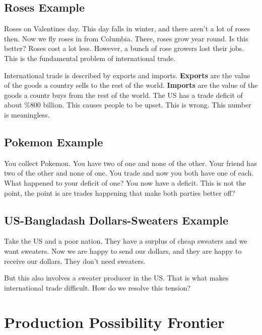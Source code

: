 \documentclass{article}
\begin{document}
\subsection{Roses Example}

Roses on Valentines day. This day falls in winter, and there aren't a lot of
roses then. Now we fly roses in from Columbia. There, roses grow year round. Is
this better? Roses cost a lot less. However, a bunch of rose growers lost their
jobs. This is the fundamental problem of international trade. 

\bigbreak

International trade is described by exports and imports. \textbf{Exports} are
the value of the goods a country sells to the rest of the world.
\textbf{Imports} are the value of the goods a countr buys from the rest of the
world. The US has a trade deficit of about \%800 billion. This causes people to
be upset. This is wrong. This number is meaningless.

\subsection{Pokemon Example}

You collect Pokemon. You have two of one and none of the other. Your friend has
two of the other and none of one. You trade and now you both have one of each.
What happened to your deficit of one? You now have a deficit. This is not the
point, the point is are trades happening that make both parties better off?

\subsection{US-Bangladash Dollars-Sweaters Example}

Take the US and a poor nation. They have a surplus of cheap sweaters and we want
sweaters. Now we are happy to send our dollars, and they are happy to receive
our dollars. They don't need sweaters.

But this also involves a sweater producer in the US. That is what makes
international trade difficult. How do we resolve this tension?

\section{Production Possibility Frontier}
\end{document}
